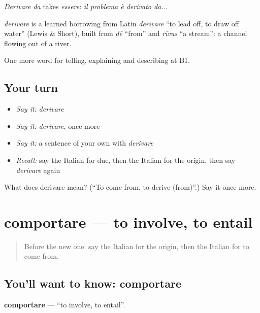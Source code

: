 \emph{Derivare da} takes \emph{essere}: \emph{il problema è derivato da...}

\begin{cousinweb}
\emph{derivare} is a learned borrowing from Latin \emph{dērīvāre} \textquotedblleft{}to lead off, to draw off water\textquotedblright{} (Lewis \& Short), built from \emph{dē} \textquotedblleft{}from\textquotedblright{} and \emph{rīvus} \textquotedblleft{}a stream\textquotedblright{}: a channel flowing out of a river.
\end{cousinweb}

\begin{grammarlens}[title={What you've built}]
One more word for telling, explaining and describing at B1.
\end{grammarlens}

\subsection*{Your turn}
\begin{itemize}
\raggedright
  \item \emph{Say it:} \emph{derivare}
  \item \emph{Say it:} \emph{derivare}, once more
  \item \emph{Say it:} a sentence of your own with \emph{derivare}
  \item \emph{Recall:} say the Italian for due, then the Italian for the origin, then say \emph{derivare} again
\end{itemize}

\begin{tcolorbox}[breakable,colback=teal!4,colframe=teal!35!black,title={Before you move on}]
What does derivare mean? (\textquotedblleft{}To come from, to derive (from)\textquotedblright{}.) Say it once more.
\end{tcolorbox}
\section[comportare]{comportare — to involve, to entail}

\label{lesson:IT-C351-comportare}



\begin{quote}
Before the new one: say the Italian for the origin, then the Italian for to come from.
\end{quote}

\subsection*{You'll want to know: comportare}
\textbf{comportare} — \textquotedblleft{}to involve, to entail\textquotedblright{}.

